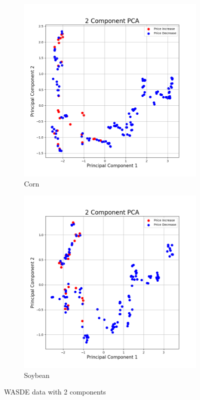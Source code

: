 \documentclass{article}
\begin{document}
\begin{figure}[h!]
\centering
\begin{subfigure}{.5\textwidth}
  \centering
  \includegraphics[scale=.3]{imagesmid/fullcorn}
\caption{Corn}
\end{subfigure}%
\begin{subfigure}{.5\textwidth}
  \centering
  \includegraphics[scale=.3]{imagesmid/fullsoy}
\caption{Soybean}
\end{subfigure}
\caption{WASDE data with 2 components}
\end{figure}
\end{document}
